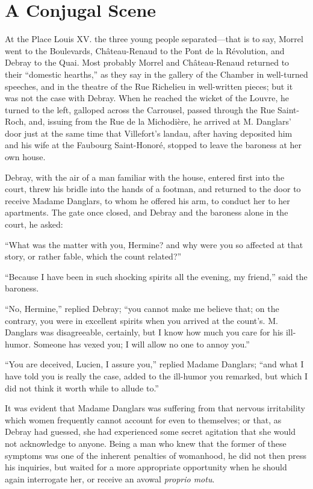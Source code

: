 \chapter{A Conjugal Scene}

At the Place Louis XV. the three young people separated—that is to say,
Morrel went to the Boulevards, Château-Renaud to the Pont de la
Révolution, and Debray to the Quai. Most probably Morrel and
Château-Renaud returned to their “domestic hearths,” as they say in the
gallery of the Chamber in well-turned speeches, and in the theatre of
the Rue Richelieu in well-written pieces; but it was not the case with
Debray. When he reached the wicket of the Louvre, he turned to the
left, galloped across the Carrousel, passed through the Rue Saint-Roch,
and, issuing from the Rue de la Michodière, he arrived at M. Danglars’
door just at the same time that Villefort’s landau, after having
deposited him and his wife at the Faubourg Saint-Honoré, stopped to
leave the baroness at her own house.

Debray, with the air of a man familiar with the house, entered first
into the court, threw his bridle into the hands of a footman, and
returned to the door to receive Madame Danglars, to whom he offered his
arm, to conduct her to her apartments. The gate once closed, and Debray
and the baroness alone in the court, he asked:

“What was the matter with you, Hermine? and why were you so affected at
that story, or rather fable, which the count related?”

“Because I have been in such shocking spirits all the evening, my
friend,” said the baroness.

“No, Hermine,” replied Debray; “you cannot make me believe that; on the
contrary, you were in excellent spirits when you arrived at the
count’s. M. Danglars was disagreeable, certainly, but I know how much
you care for his ill-humor. Someone has vexed you; I will allow no one
to annoy you.”

“You are deceived, Lucien, I assure you,” replied Madame Danglars; “and
what I have told you is really the case, added to the ill-humor you
remarked, but which I did not think it worth while to allude to.”

It was evident that Madame Danglars was suffering from that nervous
irritability which women frequently cannot account for even to
themselves; or that, as Debray had guessed, she had experienced some
secret agitation that she would not acknowledge to anyone. Being a man
who knew that the former of these symptoms was one of the inherent
penalties of womanhood, he did not then press his inquiries, but waited
for a more appropriate opportunity when he should again interrogate
her, or receive an avowal \textit{proprio motu}.

